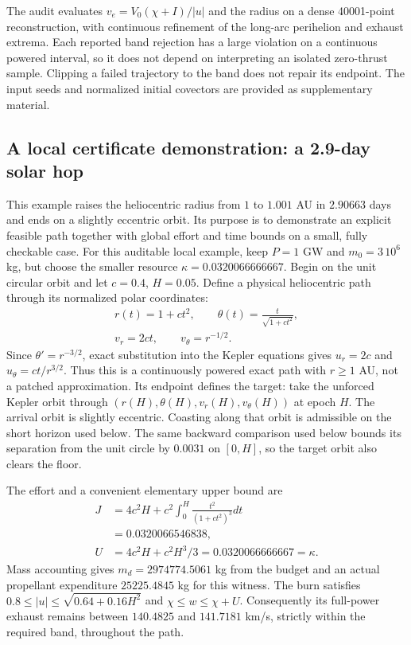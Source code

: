 The audit evaluates $v_e=V_0(\chi+I)/|u|$ and the radius on a dense
40001-point reconstruction, with continuous refinement of the long-arc
perihelion and exhaust extrema. Each reported band rejection has a large
violation on a continuous powered interval, so it does not depend on
interpreting an isolated zero-thrust sample. Clipping a failed trajectory
to the band does not repair its endpoint. The input seeds and normalized initial covectors are provided as
supplementary material.

\subsection{A local certificate demonstration: a 2.9-day solar hop}
This example raises the heliocentric radius from $1$ to $1.001$ AU
in $2.90663$ days and ends on a slightly eccentric orbit. Its purpose
is to demonstrate an explicit feasible path together with global effort
and time bounds on a small, fully checkable case.
For this auditable local example, keep $P=1$ GW and $m_0=3\,10^6$ kg,
but choose the smaller resource $\kappa=0.0320066666667$. Begin on the
unit circular orbit and let $c=0.4$, $H=0.05$. Define a physical
heliocentric path through its normalized polar coordinates:
\begin{equation}
 \begin{gathered}
 r(t)=1+ct^2,\qquad \theta(t)=\frac{t}{\sqrt{1+ct^2}},\\
 v_r=2ct,\qquad v_\theta=r^{-1/2}.
 \end{gathered}
\end{equation}
Since $\theta'=r^{-3/2}$, exact substitution into the Kepler equations
gives $u_r=2c$ and $u_\theta=ct/r^{3/2}$. Thus this is a continuously
powered exact path with $r\ge1$ AU, not a patched approximation. Its
endpoint defines the target: take the unforced Kepler orbit through
$(r(H),\theta(H),v_r(H),v_\theta(H))$ at epoch $H$. The arrival orbit is
slightly eccentric.
Coasting along that orbit is admissible on the short horizon used below.
The same backward comparison used below bounds its separation from the
unit circle by $0.0031$ on $[0,H]$, so the target orbit also clears the floor.

The effort and a convenient elementary upper bound are
\begin{equation}
\begin{split}
 J&=4c^2H+c^2\int_0^H\frac{t^2}{(1+ct^2)^3}dt\\
  &=0.0320066546838,\\
 U&=4c^2H+c^2H^3/3=0.0320066666667=\kappa.
\end{split}
\end{equation}
Mass accounting gives $m_d=2974774.5061$ kg from the budget and an actual
propellant expenditure $25225.4845$ kg for this witness. The burn satisfies
$0.8\le|u|\le\sqrt{0.64+0.16H^2}$ and $\chi\le w\le\chi+U$.
Consequently its full-power exhaust remains between $140.4825$ and
$141.7181$ km/s, strictly within the required band, throughout the path.

